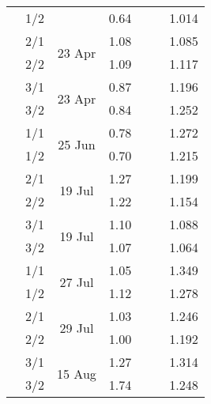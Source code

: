\begin{table}
\begin{threeparttable}
\begin{tabular}{c c c c c c c}
		& 1/2 & & 0.64 & & & 1.014 \\
		& 2/1 & \multirow{2}{*}{23 Apr} & 1.08 & & & 1.085 \\
		& 2/2 & & 1.09 & & & 1.117 \\
		& 3/1 & \multirow{2}{*}{23 Apr}  & 0.87 & & & 1.196 \\
		& 3/2 & & 0.84 & & & 1.252 \\
	\hline
		\multirow{6}{*}{\rotatebox[origin=c]{90}{NGC 612}}& 1/1 & \multirow{2}{*}{25 Jun} & 0.78 & & & 1.272 \\
		& 1/2 & & 0.70 & & & 1.215 \\
		& 2/1 & \multirow{2}{*}{19 Jul} & 1.27 & & & 1.199 \\
		& 2/2 & & 1.22 & & & 1.154 \\
		& 3/1 & \multirow{2}{*}{19 Jul}  & 1.10 & & & 1.088 \\
		& 3/2 & & 1.07 & & & 1.064 \\
	\hline
		\multirow{6}{*}{\rotatebox[origin=c]{90}{NGC 1399}}& 1/1 & \multirow{2}{*}{27 Jul} & 1.05 & & & 1.349 \\
		& 1/2 & & 1.12 & & & 1.278 \\
		& 2/1 & \multirow{2}{*}{29 Jul} & 1.03 & & & 1.246 \\
		& 2/2 & & 1.00 & & & 1.192 \\
		& 3/1 & \multirow{2}{*}{15 Aug}  & 1.27 & & & 1.314 \\
		& 3/2 & & 1.74 & & & 1.248 \\
	\hline
		



	\end{tabular}
\end{threeparttable}
\end{table}


